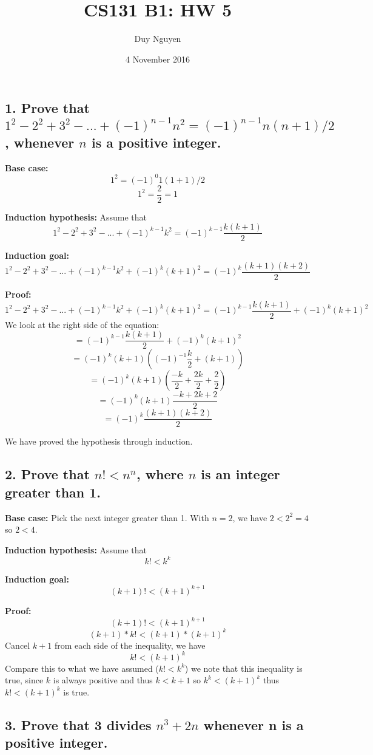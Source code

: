 \documentclass{article}
\title{CS131 B1: HW 5}
\author{Duy Nguyen}
\date{4 November 2016}
\begin{document}
\maketitle

\subsection*{1. Prove that $1^2 - 2^2 + 3^2 - ... + (-1)^{n-1} n^2 = (-1)^{n-1} n(n+1)/2$, whenever $n$ is a positive integer.}

\textbf{Base case:}
$$1^2 = (-1)^0 1(1+1)/2$$
$$1^2 = \frac{2}{2} = 1$$

\textbf{Induction hypothesis:} Assume that
$$1^2 - 2^2 + 3^2 - ... + (-1)^{k-1} k^2 = (-1)^{k-1} \frac{k(k+1)}{2}$$

\textbf{Induction goal:} 
$$1^2 - 2^2 + 3^2 - ... + (-1)^{k-1} k^2 + (-1)^{k} (k+1)^2 = (-1)^{k} \frac{(k+1)(k+2)}{2}$$

\textbf{Proof:}
$$1^2 - 2^2 + 3^2 - ... + (-1)^{k-1} k^2 + (-1)^{k} (k+1)^2 = (-1)^{k-1} \frac{k(k+1)}{2} + (-1)^{k} (k+1)^2$$
We look at the right side of the equation:
$$ = (-1)^{k-1} \frac{k(k+1)}{2} + (-1)^{k} (k+1)^2$$
$$ = (-1)^{k} (k+1) ((-1)^{-1}\frac{k}{2} + (k+1))$$
$$ = (-1)^{k} (k+1) (\frac{-k}{2} + \frac{2k}{2} + \frac{2}{2})$$
$$ = (-1)^{k} (k+1) \frac{-k + 2k +2}{2}$$
$$ = (-1)^{k} \frac{(k+1) (k+2)}{2}$$

We have proved the hypothesis through induction.

\subsection*{2. Prove that $n!<n^n$, where $n$ is an integer greater than 1.}

\textbf{Base case:}
Pick the next integer greater than 1. With $n=2$, we have $2<2^2 = 4$ so $2<4$.

\textbf{Induction hypothesis:} Assume that 
$$k! < k^k$$

\textbf{Induction goal:}
$$(k+1)! < (k+1)^{k+1}$$

\textbf{Proof:}
$$(k+1)!< (k+1)^{k+1}$$
$$(k+1)*k!<(k+1)*(k+1)^k$$
Cancel $k+1$ from each side of the inequality, we have
$$k! < (k+1)^k$$
Compare this to what we have assumed ($k! < k^k$) we note that this inequality is true, since $k$ is always positive and thus $k<k+1$ so $k^k<(k+1)^k$ thus $k! < (k+1)^k$ is true.

\subsection*{3. Prove that 3 divides $n^3 +2n$ whenever n is a positive integer.}
\end{document}
